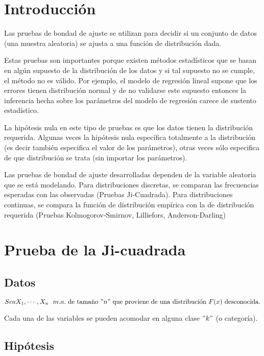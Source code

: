 \documentclass[
  a4paper,
  oneside,
  openany]{book}
\begin{document}
\hypertarget{introducciuxf3n-4}{%
\chapter*{Introducción}\label{introducciuxf3n-4}}


Las pruebas de bondad de ajuste se utilizan para decidir si un conjunto de datos (una muestra aleatoria) se ajusta a una función de distribución dada.

Estas pruebas son importantes porque existen métodos estadísticos que se basan en algún supuesto de la distribución de los datos y si tal supuesto no se cumple, el método no es válido. Por ejemplo, el modelo de regresión lineal supone que los errores tienen distribución normal y de no validarse este supuesto entonces la inferencia hecha sobre los parámetros del modelo de regresión carece de sustento estadístico.

La hipótesis nula en este tipo de pruebas es que los datos tienen la distribución requerida. Algunas veces la hipótesis nula específica totalmente a la distribución (es decir también especifica el valor de los parámetros), otras veces sólo especifica de que distribución se trata (sin importar los parámetros).

Las pruebas de bondad de ajuste desarrolladas dependen de la variable aleatoria que se está modelando. Para distribuciones discretas, se comparan las frecuencias esperadas con las observadas (Pruebas Ji-Cuadrada). Para distribuciones continuas, se compara la función de distribución empírica con la de distribución requerida (Pruebas Kolmogorov-Smirnov, Lilliefors, Anderson-Darling)

\hypertarget{prueba-de-la-ji-cuadrada}{%
\chapter{Prueba de la Ji-cuadrada}\label{prueba-de-la-ji-cuadrada}}

\hypertarget{datos-14}{%
\section{Datos}\label{datos-14}}

\[ Sea X_{1},\cdots,X_{n} \ \ m.a. \  \mbox{de tamaño} \  "n"\  \mbox{que proviene de una distribución} \  F(x) \  \mbox{desconocida.}\]

Cada una de las variables se pueden acomodar en alguna clase \("k"\) (o categoría).

\hypertarget{hipuxf3tesis-12}{%
\section{Hipótesis}\label{hipuxf3tesis-12}}
\end{document}
